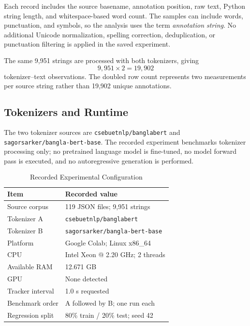 \documentclass[conference]{IEEEtran}
\begin{document}
Each record includes the source basename, annotation position, raw text, Python string length, and whitespace-based word count. The samples can include words, punctuation, and symbols, so the analysis uses the term \textit{annotation string}. No additional Unicode normalization, spelling correction, deduplication, or punctuation filtering is applied in the saved experiment.

The same 9,951 strings are processed with both tokenizers, giving
\begin{equation}
9,951\times2=19,902
\end{equation}
tokenizer--text observations. The doubled row count represents two measurements per source string rather than 19,902 unique annotations.

\subsection{Tokenizers and Runtime}
The two tokenizer sources are \texttt{csebuetnlp/banglabert} and \texttt{sagorsarker/bangla-bert-base}. The recorded experiment benchmarks tokenizer processing only; no pretrained language model is fine-tuned, no model forward pass is executed, and no autoregressive generation is performed.

\begin{table}[htbp]
\caption{Recorded Experimental Configuration}
\label{tab:config}
\centering
\scriptsize
\begin{tabular}{p{} p{}}
\toprule
\textbf{Item} & \textbf{Recorded value}\\
\midrule
Source corpus & 119 JSON files; 9,951 strings\\
Tokenizer A & \texttt{csebuetnlp/banglabert}\\
Tokenizer B & \texttt{sagorsarker/bangla-bert-base}\\
Platform & Google Colab; Linux x86\_64\\
CPU & Intel Xeon @ 2.20 GHz; 2 threads\\
Available RAM & 12.671 GB\\
GPU & None detected\\
Tracker interval & 1.0 s requested\\
Benchmark order & A followed by B; one run each\\
Regression split & 80\% train / 20\% test; seed 42\\
\bottomrule
\end{tabular}
\end{table}
\end{document}
